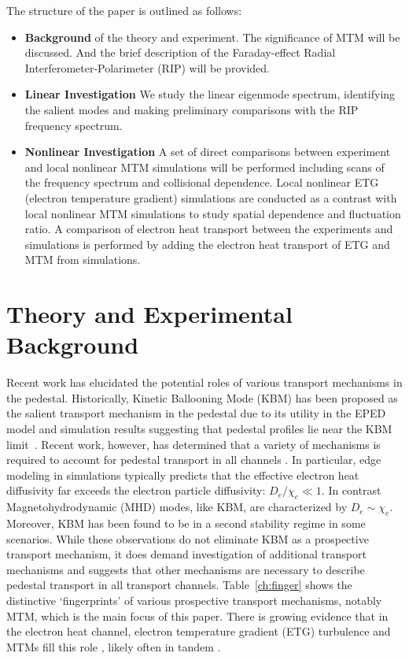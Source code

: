 \documentclass[
 aip,
 amsmath,amssymb,
 reprint
]{revtex4-1}
\begin{document}
The structure of the paper is outlined as follows: 

\begin{itemize}
    \item  \textbf{Background} of the theory and experiment. The significance of MTM will be discussed. And the brief description of the Faraday-effect Radial Interferometer-Polarimeter (RIP) will be provided.
    
    \item \textbf{Linear Investigation} We study the linear eigenmode spectrum, identifying the salient modes and making preliminary comparisons with the RIP frequency spectrum.
    
    \item \textbf{Nonlinear Investigation} A set of direct comparisons between experiment and local nonlinear MTM simulations will be performed including scans of the frequency spectrum and collisional dependence. Local nonlinear ETG (electron temperature gradient) simulations are conducted as a contrast with local nonlinear MTM simulations to study spatial dependence and fluctuation ratio. A comparison of electron heat transport between the experiments and simulations is performed by adding the electron heat transport of ETG and MTM from simulations.
\end{itemize}

\section{Theory and Experimental Background}
\label{background}

Recent work has elucidated the potential roles of various transport mechanisms in the pedestal.  Historically, Kinetic Ballooning Mode (KBM) has been proposed as the salient transport mechanism in the pedestal due to its utility in the EPED model and simulation results suggesting that pedestal profiles lie near the KBM limit~\cite{Saarelma_2017,Hatch_2015,Hatch_2016,Canik_2013}.
Recent work, however, has determined that a variety of mechanisms is required to account for pedestal transport in all channels \cite{Kotschenreuther_2019,TPT19,Joel_prl,Fenstermacher_2022}.  In particular, edge modeling in simulations \cite{TPT19} typically predicts that the effective electron heat diffusivity far exceeds the electron particle diffusivity: $D_e / \chi_e \ll 1$.  In contrast Magnetohydrodynamic (MHD) modes, like KBM, are characterized by $D_e \sim \chi_e$.  Moreover, KBM has been found to be in a second stability regime in some scenarios.  While these observations do not eliminate KBM as a prospective transport mechanism, it does demand investigation of additional transport mechanisms and suggests that other mechanisms are necessary to describe pedestal transport in all transport channels.  Table~\ref{ch:finger} shows the distinctive `fingerprints' of various prospective transport mechanisms, notably MTM, which is the main focus of this paper.  There is growing evidence that in the electron heat channel, electron temperature gradient (ETG) turbulence and MTMs fill this role \cite{Hatch_2016,Ehab_MTM,Curie_2022_SLiM,Kotschenreuther_2019,RIP_Chen_POP_2020}, likely often in tandem \cite{Hatch_2021,Pueschel_2020}.  
\end{document}
